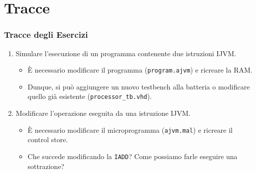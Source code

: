 \documentclass{beamer}
\begin{document}
\section{Tracce}
\begin{frame}
  \frametitle{Tracce degli Esercizi}
  \begin{enumerate}
    \item Simulare l'esecuzione di un programma contenente due istruzioni IJVM.
    \begin{itemize}
      \item È necessario modificare il programma (\lstinline{program.ajvm}) e
      ricreare la RAM.
      \item Dunque, si può aggiungere un nuovo testbench alla batteria o
      modificare quello già esistente (\lstinline{processor_tb.vhd}).
    \end{itemize}
    \item Modificare l'operazione eseguita da una istruzione IJVM.
    \begin{itemize}
      \item È necessario modificare il microprogramma (\lstinline{ajvm.mal}) e
      ricreare il control store.
      \item Che succede modificando la \lstinline{IADD}? Come possiamo farle
      eseguire una sottrazione?
    \end{itemize}
  \end{enumerate}
\end{frame}
\end{document}
